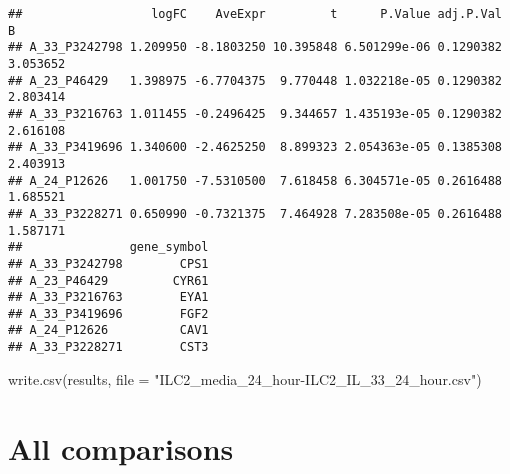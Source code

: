 \documentclass[
]{article}
\newenvironment{Shaded}{\begin{snugshade}}{\end{snugshade}}
\newcommand{\AttributeTok}[1]{\textcolor[rgb]{0.77,0.63,0.00}{#1}}
\newcommand{\FunctionTok}[1]{\textcolor[rgb]{0.00,0.00,0.00}{#1}}
\newcommand{\NormalTok}[1]{#1}
\newcommand{\StringTok}[1]{\textcolor[rgb]{0.31,0.60,0.02}{#1}}
\begin{document}
\begin{verbatim}
##                  logFC    AveExpr         t      P.Value adj.P.Val        B
## A_33_P3242798 1.209950 -8.1803250 10.395848 6.501299e-06 0.1290382 3.053652
## A_23_P46429   1.398975 -6.7704375  9.770448 1.032218e-05 0.1290382 2.803414
## A_33_P3216763 1.011455 -0.2496425  9.344657 1.435193e-05 0.1290382 2.616108
## A_33_P3419696 1.340600 -2.4625250  8.899323 2.054363e-05 0.1385308 2.403913
## A_24_P12626   1.001750 -7.5310500  7.618458 6.304571e-05 0.2616488 1.685521
## A_33_P3228271 0.650990 -0.7321375  7.464928 7.283508e-05 0.2616488 1.587171
##               gene_symbol
## A_33_P3242798        CPS1
## A_23_P46429         CYR61
## A_33_P3216763        EYA1
## A_33_P3419696        FGF2
## A_24_P12626          CAV1
## A_33_P3228271        CST3
\end{verbatim}

\begin{Shaded}
\begin{Highlighting}[]
\FunctionTok{write.csv}\NormalTok{(results, }\AttributeTok{file =} \StringTok{"ILC2\_media\_24\_hour{-}ILC2\_IL\_33\_24\_hour.csv"}\NormalTok{)}
\end{Highlighting}
\end{Shaded}

\hypertarget{all-comparisons}{%
\section{All comparisons}\label{all-comparisons}}
\end{document}
